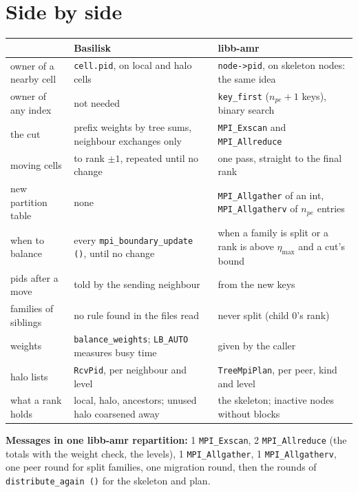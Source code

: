 \documentclass[10pt,a4paper]{article}
\theoremstyle{definition}
\newcommand{\fn}[1]{\texttt{#1}}
\begin{document}


\section{Side by side}

\begin{center}
\small
\begin{tabular}{>{\raggedright}p{3.2cm} >{\raggedright}p{5.6cm}
  >{\raggedright\arraybackslash}p{5.6cm}}
  \toprule
  & \textbf{Basilisk} & \textbf{libb-amr} \\
  \midrule
  owner of a nearby cell & \fn{cell.pid}, on local and halo cells &
    \fn{node->pid}, on skeleton nodes: the same idea \\
  owner of any index & not needed & \fn{key\_first} ($n_{pe}+1$ keys),
    binary search \\
  the cut & prefix weights by tree sums, neighbour exchanges only &
    \fn{MPI\_Exscan} and \fn{MPI\_Allreduce} \\
  moving cells & to rank $\pm 1$, repeated until no change & one pass,
    straight to the final rank \\
  new partition table & none & \fn{MPI\_Allgather} of an int,
    \fn{MPI\_Allgatherv} of $n_{pe}$ entries \\
  when to balance & every \fn{mpi\_boundary\_update ()}, until no change &
    when a family is split or a rank is above $\eta_{\max}$ and a cut's
    bound \\
  pids after a move & told by the sending neighbour & from the new keys \\
  families of siblings & no rule found in the files read & never split
    (child 0's rank) \\
  weights & \fn{balance\_weights}; \fn{LB\_AUTO} measures busy time &
    given by the caller \\
  halo lists & \fn{RcvPid}, per neighbour and level & \fn{TreeMpiPlan},
    per peer, kind and level \\
  what a rank holds & local, halo, ancestors; unused halo coarsened away &
    the skeleton; inactive nodes without blocks \\
  \bottomrule
\end{tabular}
\end{center}

\textbf{Messages in one libb-amr repartition:} 1 \fn{MPI\_Exscan}, 2
\fn{MPI\_Allreduce} (the totals with the weight check, the levels), 1
\fn{MPI\_Allgather}, 1 \fn{MPI\_Allgatherv}, one peer round for split
families, one migration round, then the rounds of \fn{distribute\_again
()} for the skeleton and plan.
\end{document}
